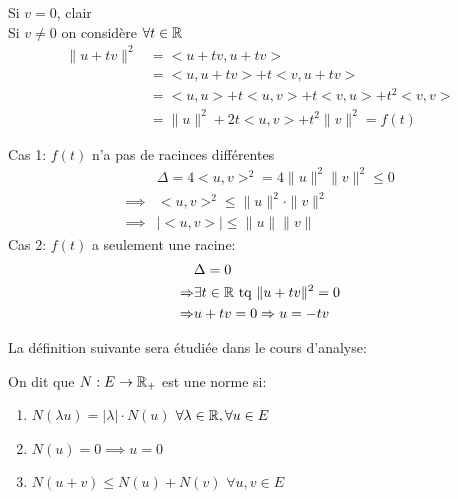 \begin{explanation}
   Si $v = 0$, clair\\
   Si $v \neq 0$ on considère $\forall t \in \mathbb{R}$
   \begin{align*}
       \|u + tv\|^2 &= <u + tv, u + tv>\\ 
                    &= <u, u + tv> + t<v, u + tv>\\
                    &= <u, u> + t<u, v> + t<v, u> + t^2<v, v>\\
                    &= \|u\|^2 + 2t<u, v> + t^2 \|v\|^2 = f(t)
   \end{align*}
   \begin{center}
   \end{center}
Cas 1: $f(t)$ n'a pas de racinces différentes
\begin{align*}
    &\Delta = 4<u, v>^2 = 4\|u\|^2\|v\|^2 \le 0\\
    \implies & <u, v>^2 \le \|u\|^2 \cdot \|v\|^2\\
    \implies & |<u, v>| \le \|u\|\|v\|
\end{align*}
Cas 2: $f(t)$ a seulement une racine:\\
\begin{align*}
    &\Delta = 0\\
    \Rightarrow & \exists t \in \mathbb{R} \text{ tq } \|u + tv\|^2 = 0\\
    \Rightarrow &u + tv = 0 \Rightarrow u = -tv
\end{align*}
\end{explanation}
La définition suivante sera étudiée dans le cours d'analyse:
\begin{definition}
    On dit que $N: E \to \mathbb{R}_+$ est une norme si:
    \begin{enumerate}
        \item $N(\lambda u) = |\lambda| \cdot N(u)$ \quad  $\forall \lambda \in \mathbb{R}, \forall u \in E$
        \item $N(u) = 0 \implies u = 0$
        \item $N(u + v) \le N(u) + N(v)$ \quad $\forall u, v \in E$
    \end{enumerate}
\end{definition}
